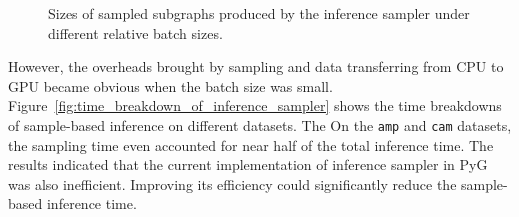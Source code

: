 \begin{figure}[H]
   \centering
   
   \caption{Sizes of sampled subgraphs produced by the inference sampler under different relative batch sizes.}
   \label{fig:sampled_graph_size}
\end{figure}

However, the overheads brought by sampling and data transferring from CPU to GPU became obvious when the batch size was small.
%
Figure~\ref{fig:time_breakdown_of_inference_sampler} shows the time breakdowns of sample-based inference on different datasets.
%
The 
%
On the \texttt{amp} and \texttt{cam} datasets, the sampling time even accounted for near half of the total inference time.
%
The results indicated that the current implementation of inference sampler in PyG was also inefficient.
%
Improving its efficiency could significantly reduce the sample-based inference time.


